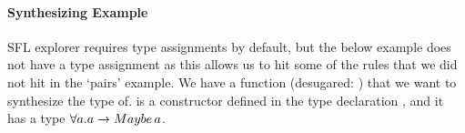 \paragraph{Synthesizing Example}
\label{c2:types_demo_2}
\ac{SFL} explorer requires type assignments by default, but the below example does not have a type assignment as this allows us to hit some of the rules that we did not hit in the `pairs' example. We have a function  (desugared: ) that we want to synthesize the type of.  is a constructor defined in the type declaration , and it has a type $\forall a. a \rightarrow Maybe\,a$.

\begin{figure}[t]
\end{figure}
